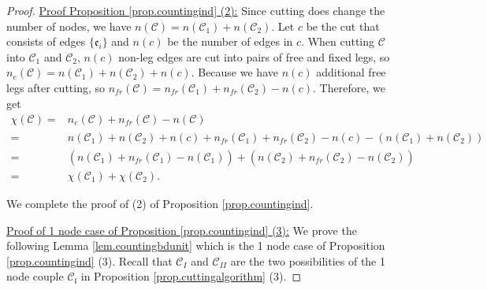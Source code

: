\begin{proof}
\underline{Proof Proposition \ref{prop.countingind} (2):} Since cutting does change the number of nodes, we have $n(\mathcal{C})=n(\mathcal{C}_1)+n(\mathcal{C}_2)$. Let $c$ be the cut that consists of edges $\{\mathfrak{e}_{i}\}$ and $n(c)$ be the number of edges in $c$. 
When cutting $\mathcal{C}$ into $\mathcal{C}_1$ and $\mathcal{C}_2$, $n(c)$ non-leg edges are cut into pairs of free and fixed legs, so $n_e(\mathcal{C})=n(\mathcal{C}_1)+n(\mathcal{C}_2)+n(c)$. Because we have $n(c)$ additional free legs after cutting, so $n_{\textit{fr}}(\mathcal{C})=n_{\textit{fr}}(\mathcal{C}_1)+n_{\textit{fr}}(\mathcal{C}_2)-n(c)$. Therefore, we get
\begin{equation}
\begin{split}
    \chi(\mathcal{C})=&n_e(\mathcal{C})+n_{\textit{fr}}(\mathcal{C})-n(\mathcal{C})
    \\
    =&n(\mathcal{C}_1)+n(\mathcal{C}_2)+n(c)+n_{\textit{fr}}(\mathcal{C}_1)+n_{\textit{fr}}(\mathcal{C}_2)-n(c)-(n(\mathcal{C}_1)+n(\mathcal{C}_2))
    \\
    =&(n(\mathcal{C}_1)+n_{\textit{fr}}(\mathcal{C}_1)-n(\mathcal{C}_1))+(n(\mathcal{C}_2)+n_{\textit{fr}}(\mathcal{C}_2)-n(\mathcal{C}_2))
    \\
    =&\chi(\mathcal{C}_1)+\chi(\mathcal{C}_2).
\end{split}
\end{equation}

We complete the proof of (2) of Proposition \ref{prop.countingind}.

\underline{Proof of 1 node case of Proposition \ref{prop.countingind} (3):} We prove the following Lemma \ref{lem.countingbdunit} which is the 1 node case of Proposition \ref{prop.countingind} (3). Recall that $\mathcal{C}_{I}$ and $\mathcal{C}_{II}$ are the two possibilities of the 1 node couple $\mathcal{C}_{\mathfrak{l}}$ in Proposition \ref{prop.cuttingalgorithm} (3).


\end{proof}
